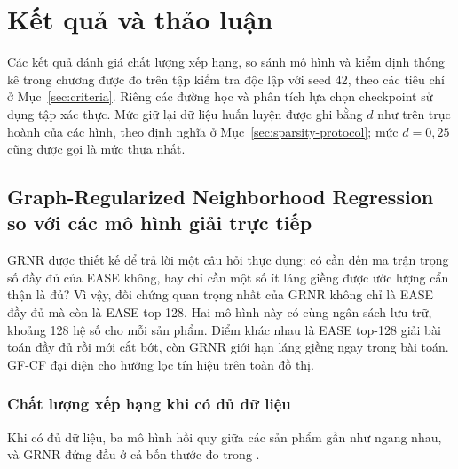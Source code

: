 \section{Kết quả và thảo luận}
\label{sec:results}

Các kết quả đánh giá chất lượng xếp hạng, so sánh mô hình và kiểm định thống kê trong chương được đo trên tập kiểm tra độc lập với seed 42, theo các tiêu chí ở Mục~\ref{sec:criteria}. Riêng các đường học và phân tích lựa chọn checkpoint sử dụng tập xác thực. Mức giữ lại dữ liệu huấn luyện được ghi bằng $d$ như trên trục hoành của các hình, theo định nghĩa ở Mục~\ref{sec:sparsity-protocol}; mức $d=0{,}25$ cũng được gọi là mức thưa nhất.

\FloatBarrier
\subsection{Graph-Regularized Neighborhood Regression so với các mô hình giải trực tiếp}
\label{sec:grnr-results}

GRNR được thiết kế để trả lời một câu hỏi thực dụng: có cần đến ma trận trọng số đầy đủ của EASE không, hay chỉ cần một số ít láng giềng được ước lượng cẩn thận là đủ? Vì vậy, đối chứng quan trọng nhất của GRNR không chỉ là EASE đầy đủ mà còn là EASE top-128. Hai mô hình này có cùng ngân sách lưu trữ, khoảng 128 hệ số cho mỗi sản phẩm. Điểm khác nhau là EASE top-128 giải bài toán đầy đủ rồi mới cắt bớt, còn GRNR giới hạn láng giềng ngay trong bài toán. GF-CF đại diện cho hướng lọc tín hiệu trên toàn đồ thị.

\FloatBarrier
\subsubsection{Chất lượng xếp hạng khi có đủ dữ liệu}

Khi có đủ dữ liệu, ba mô hình hồi quy giữa các sản phẩm gần như ngang nhau, và GRNR đứng đầu ở cả bốn thước đo trong .

